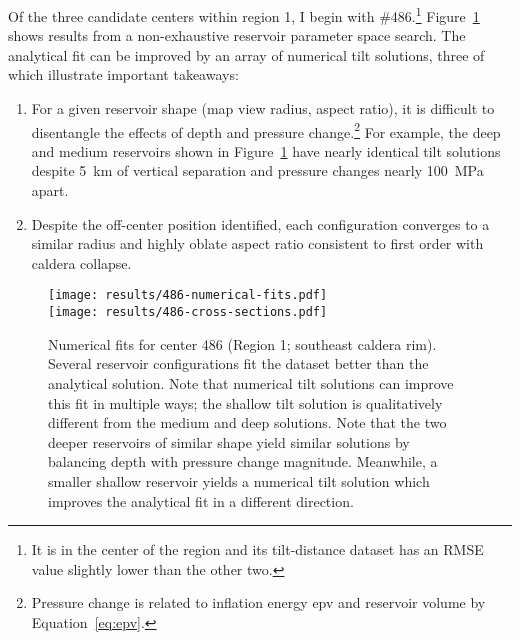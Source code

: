 Of the three candidate centers within region 1, I begin with \#486.\footnote{It is in the center of the region and its tilt-distance dataset has an \acs{RMSE} value slightly lower than the other two.} Figure~\ref{fig:486-numerical-fits} shows results from a non-exhaustive reservoir parameter space search. The analytical fit can be improved by an array of numerical tilt solutions, three of which illustrate important takeaways:
\begin{enumerate}
    \item For a given reservoir shape (map view radius, aspect ratio), it is difficult to disentangle the effects of depth and pressure change.\footnote{Pressure change is related to inflation energy \acs{epv} and reservoir volume by Equation~\eqref{eq:epv}.} For example, the deep and medium reservoirs shown in Figure~\ref{fig:486-numerical-fits} have nearly identical tilt solutions despite \qty{5}{km} of vertical separation and pressure changes nearly \qty{100}{\mega\Pa} apart. 
    \item Despite the off-center position identified, each configuration converges to a similar radius and highly oblate aspect ratio consistent to first order with caldera collapse.
\end{enumerate}

\begin{figure}
    \texttt{[image: results/486-numerical-fits.pdf]}\\
    \texttt{[image: results/486-cross-sections.pdf]}%
    \caption[Numerical parameter fits (center 486)]{Numerical fits for center 486 (Region 1; southeast caldera rim). Several reservoir configurations fit the dataset better than the analytical solution. Note that numerical tilt solutions can improve this fit in multiple ways; the shallow tilt solution is qualitatively different from the medium and deep solutions. Note that the two deeper reservoirs of similar shape yield similar solutions by balancing depth with pressure change magnitude. Meanwhile, a smaller shallow reservoir yields a numerical tilt solution which improves the analytical fit in a different direction.}
    \label{fig:486-numerical-fits}
\end{figure}